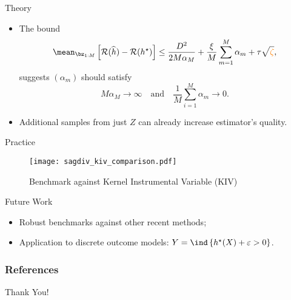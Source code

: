 \documentclass[aspectratio=169]{beamer}
\begin{document}
    \begin{frame}{Theory}
        \begin{itemize}
            \item<1-> The bound
                \begin{align*}
                    \mean_{ \bz_{ 1:M } } \left[
                        \risk ( \hat{ h } ) - \risk ( \hstar )
                    \right]
                    \leq \frac{ D^2 }{ 2 M \alpha_{ M } }
                    + \frac{ \xi }{ M } \sum_{ m=1 }^{ M } \alpha_{ m }
                    + \tau \sqrt{ {\color{orange}\zeta} },
                \end{align*}
                suggests $ ( \alpha_{ m } ) $ should satisfy
                \begin{equation*}
                    M \alpha_{ M } \to \infty \quad \text{and} \quad \frac{ 1 }{ M } \sum_{ i=1 }^{ M } \alpha_{ m } \to 0
                .\end{equation*}
            \item<2-> Additional samples from just $ Z $ can already increase estimator's quality.
        \end{itemize}
    \end{frame}

    \begin{frame}{Practice}
        \begin{figure}[htb]
            \begin{center}
                \texttt{[image: sagdiv\_kiv\_comparison.pdf]}
            \end{center}
            \caption{Benchmark against Kernel Instrumental Variable (KIV) \cite{singh2019}}
        \end{figure}
    \end{frame}

    \begin{frame}{Future Work}
        \begin{itemize}
            \item<1-> Robust benchmarks against other recent methods;
            \item<1-> Application to discrete outcome models: $ Y = \ind \left\{ \hstar ( X ) + \varepsilon > 0 \right\} $.
        \end{itemize}
    \end{frame}

    \begin{frame}
        \frametitle{References}
        \nocite{*}
        \printbibliography
    \end{frame}

    \begin{frame}
        \centering Thank You!
    \end{frame}
\end{document}
